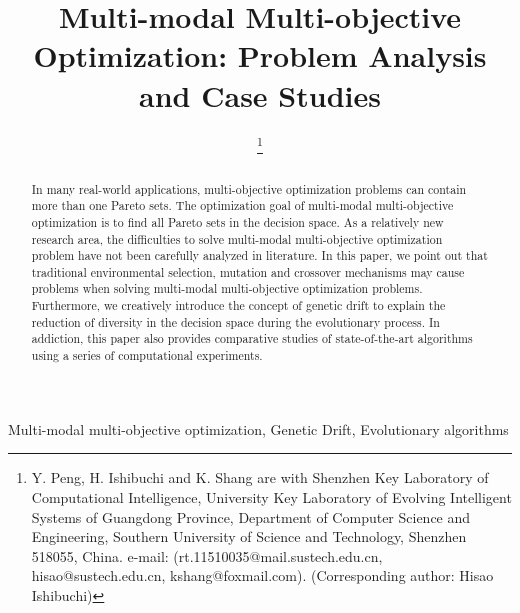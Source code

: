 \documentclass[conference]{IEEEtran}
\begin{document}
\title{Multi-modal Multi-objective Optimization: Problem Analysis and Case Studies
}
\author{
\thanks{Y. Peng, H. Ishibuchi and K. Shang are with Shenzhen Key Laboratory of Computational Intelligence, University Key Laboratory of Evolving Intelligent Systems of Guangdong Province, Department of Computer Science and Engineering, Southern University of Science and Technology, Shenzhen 518055, China. e-mail: (rt.11510035@mail.sustech.edu.cn, hisao@sustech.edu.cn, kshang@foxmail.com). (Corresponding author: Hisao Ishibuchi)}
}

\maketitle

\begin{abstract}
In many real-world applications, multi-objective optimization problems can contain more than one Pareto sets. The optimization goal of multi-modal multi-objective optimization is to find all Pareto sets in the decision space. As a relatively new research area, the difficulties to solve multi-modal multi-objective optimization problem have not been carefully analyzed in literature. In this paper, we point out that traditional environmental selection, mutation and crossover mechanisms may cause problems when solving multi-modal multi-objective optimization problems. Furthermore, we creatively introduce the concept of genetic drift to explain the reduction of diversity in the decision space during the evolutionary process. In addiction, this paper also provides comparative studies of state-of-the-art algorithms using a series of computational experiments.
\end{abstract}

\begin{IEEEkeywords}
Multi-modal multi-objective optimization, Genetic Drift, Evolutionary algorithms
\end{IEEEkeywords}
\end{document}
